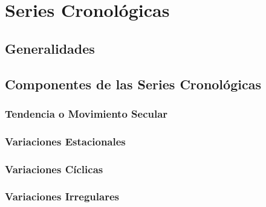 \chapter{Series Cronológicas}
\section{Generalidades}
\section{Componentes de las Series Cronológicas}
\subsection{Tendencia o Movimiento Secular}
\subsection{Variaciones Estacionales}
\subsection{Variaciones Cíclicas}
\subsection{Variaciones Irregulares}